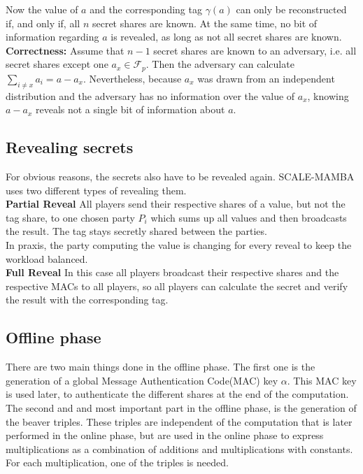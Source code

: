 \documentclass[english,runningheads,a4paper]{llncs}[2018/03/10]
\begin{document}
Now the value of \(a\) and the corresponding tag \(\gamma(a)\) can only be reconstructed if, and only if, all \(n\) secret shares are known. At the same time, no bit of information regarding \(a\) is revealed, as long as not all secret shares are known.\\
\textbf{Correctness:} Assume that $n-1$ secret shares are known to an adversary, i.e. all secret shares except one $a_x \in \mathcal{F}_p $. Then the adversary can calculate $\sum_{i \neq x} a_i = a-a_x$. Nevertheless, because $a_x$ was drawn from an independent distribution and the adversary has no information over the value of \(a_x\), knowing $a-a_x$ reveals not a single bit of information about $a$.\\


\subsection{Revealing secrets}

For obvious reasons, the secrets also have to be revealed again. SCALE-MAMBA uses two different types of revealing them.\\

\textbf{Partial Reveal}
All players send their respective shares of a value, but not the tag share, to one chosen party \(P_i\) which sums up all values and then broadcasts the result. The tag stays secretly shared between the parties.\\
In praxis, the party computing the value is changing for every reveal to keep the workload balanced.\\
\textbf{Full Reveal}
In this case all players broadcast their respective shares and the respective MACs to all players, so all players can calculate the secret and verify the result with the corresponding tag.\\


\subsection{Offline phase}

There are two main things done in the offline phase. The first one is the generation of a global Message Authentication Code(MAC) key $\alpha$. This MAC key is used later, to authenticate the different shares at the end of the computation.\\
The second and and most important part in the offline phase, is the generation of the beaver triples. These triples  are independent of the computation that is later performed in the online phase, but are used in the online phase to express multiplications as a combination of additions and multiplications with constants. For each multiplication, one of the triples is needed.
\end{document}
